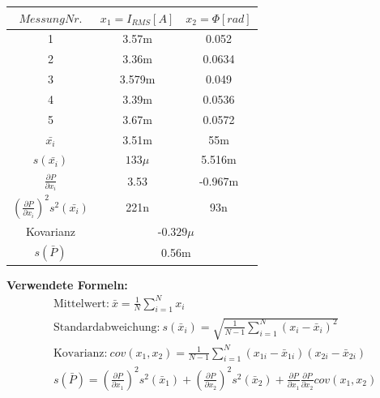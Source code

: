 \documentclass[a4paper,12pt]{article}
\begin{document}
	\begin{table}[h]
	\centering
		\begin{tabular}{|c|c|c|}
			\hline
			$Messung Nr.$ & $x_1 = I_{RMS} [A]$ & $x_2 = \Phi[rad]$\\ \hline
			\multicolumn{1}{|c|}{1} & \multicolumn{1}{c|}{3.57m} & \multicolumn{1}{c|}{0.052} \\ \hline
			\multicolumn{1}{|c|}{2} & \multicolumn{1}{c|}{3.36m}  & \multicolumn{1}{c|}{0.0634} \\ \hline
			\multicolumn{1}{|c|}{3} & \multicolumn{1}{c|}{3.579m} & \multicolumn{1}{c|}{0.049} \\ \hline
			\multicolumn{1}{|c|}{4} & \multicolumn{1}{c|}{3.39m}  & \multicolumn{1}{c|}{0.0536} \\ \hline
			\multicolumn{1}{|c|}{5} & \multicolumn{1}{c|}{3.67m}  & \multicolumn{1}{c|}{0.0572} \\ \hline
			$\bar{x_i}$ & 3.51m & 55m \\ \hline
			$s(\bar{x_i})$ & $133\mu$ & 5.516m \\ \hline
			$\frac{\partial P}{\partial x_i}$ & 3.53 & -0.967m \\ \hline
			$(\frac{\partial P}{\partial x_i})^2 s^2(\bar{x_i})$ & 221n & 93n \\ \hline
			Kovarianz  & \multicolumn{2}{c|}{-$0.329\mu$} \\ \hline
			$s(\bar{P})$ & \multicolumn{2}{c|}{0.56m}\\ \hline
		\end{tabular}
	\end{table}\newline
	\textbf{Verwendete Formeln:}
	\begin{align*}
		&\text{Mittelwert:} \ \bar{x} = \frac{1}{N} \sum_{i=1}^{N}x_i \\
		&\text{Standardabweichung:} \ s(\bar{x}_i) = \sqrt{\frac{1}{N-1}\sum_{i=1}^{N}(x_i - \bar{x}_i)^2} \\
		&\text{Kovarianz:} \ cov(x_1,x_2) = \frac{1}{N-1} \sum_{i=1}^{N}(x_{1i} - \bar{x}_{1i})(x_{2i} - \bar{x}_{2i})  \\
		&s(\bar{P}) = \left(\frac{\partial P}{\partial x_1}\right)^2 s^2(\bar{x}_1) + \left(\frac{\partial P}{\partial x_2}\right)^2 s^2(\bar{x}_2) + \frac{\partial P}{\partial x_1}\frac{\partial P}{\partial x_2}cov(x_1,x_2)
	\end{align*}
	\newpage
\end{document}
